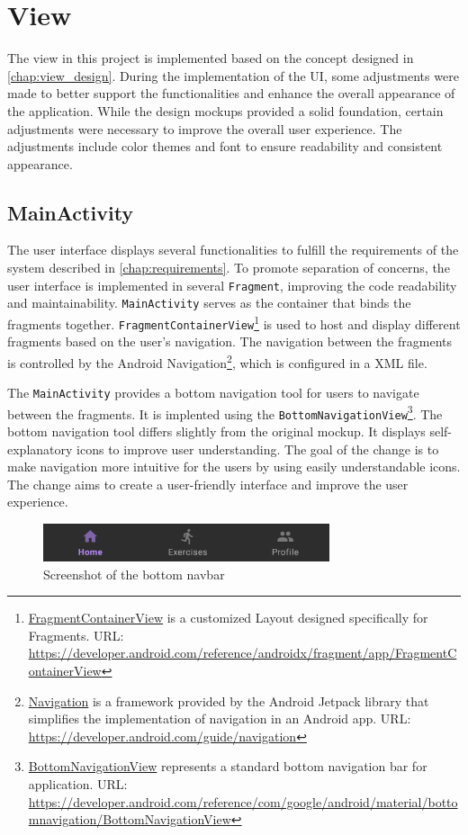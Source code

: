 \section{View}
\label{chap:view_impl}
The view in this project is implemented based on the concept designed in \autoref{chap:view_design}. 
During the implementation of the UI, some adjustments were made to better support the functionalities and enhance the overall appearance of the application.
While the design mockups provided a solid foundation, certain adjustments were necessary to improve the overall user experience.
The adjustments include color themes and font to ensure readability and consistent appearance.

\subsection{MainActivity}
The user interface displays several functionalities to fulfill the requirements of the system described in \autoref{chap:requirements}. To promote separation of concerns, the user interface is implemented in several \texttt{Fragment}, improving the code readability and maintainability.  
\texttt{MainActivity} serves as the container that binds the fragments together. \texttt{FragmentContainerView}\footnote{\url{FragmentContainerView} is a customized Layout designed specifically for Fragments. URL: \url{https://developer.android.com/reference/androidx/fragment/app/FragmentContainerView}} is used to host and display different fragments based on the user's navigation.
The navigation between the fragments is controlled by the Android Navigation\footnote{\url{Navigation} is a framework provided by the Android Jetpack library that simplifies the implementation of navigation in an Android app. URL: \url{https://developer.android.com/guide/navigation}}, which is configured in a XML file. 

The \texttt{MainActivity} provides a bottom navigation tool for users to navigate between the fragments. It is implented using the \texttt{BottomNavigationView}\footnote{\url{BottomNavigationView} represents a standard bottom navigation bar for application. URL: \url{https://developer.android.com/reference/com/google/android/material/bottomnavigation/BottomNavigationView}}.
The bottom navigation tool differs slightly from the original mockup. It displays self-explanatory icons to improve user understanding. The goal of the change is to make navigation more intuitive for the users by using easily understandable icons. The change aims to create a user-friendly interface and improve the user experience. 
\begin{figure}[H]
    \centering
    \includegraphics[width=0.75\textwidth]{images/bottom-navbar.png}
    \caption{Screenshot of the bottom navbar}
    \label{fig:bottom_navbar}
\end{figure}

